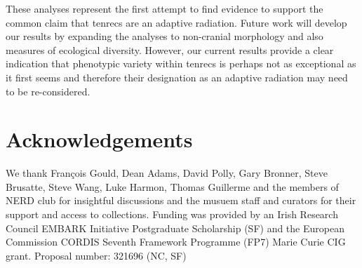 \documentclass[12pt,a4paper]{article}
\begin{document}

	These analyses represent the first attempt to find evidence to support the common claim that tenrecs are an adaptive radiation. Future work will develop our results by expanding the analyses to non-cranial morphology and also measures of ecological diversity. However, our current results provide a clear indication that phenotypic variety within tenrecs is perhaps not as exceptional as it first seems and therefore their designation as an adaptive radiation may need to be re-considered.




\section*{Acknowledgements}

	We thank Fran\c{c}ois Gould, Dean Adams, David Polly, Gary Bronner, Steve Brusatte, Steve Wang, Luke Harmon, Thomas Guillerme and the members of NERD club for insightful discussions and the musuem staff and curators for their support and access to collections. Funding was provided by an Irish Research Council EMBARK Initiative Postgraduate Scholarship (SF) and the European Commission CORDIS Seventh Framework Programme (FP7) Marie Curie CIG grant. Proposal number: 321696 (NC, SF)






\end{document}
